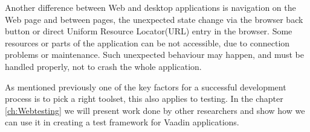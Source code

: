 		Another difference between Web and desktop applications is
		navigation on the Web page and between pages, the unexpected state change via
		the browser back button or direct Uniform Resource Locator(URL) entry in the
		browser. Some resources or parts of the application can be not
		accessible, due to connection problems or maintenance. Such unexpected
		behaviour may happen, and must be handled properly, not to crash the whole application.

    As mentioned previously one of the key factors for a successful
    development process is to pick a right toolset, this also applies to
    testing. In the chapter \ref{ch:Webtesting} we will present work done by
    other researchers and show how we can use it in creating a test framework
    for Vaadin applications.
      
\iffalse
		Web testing includes the different type of testing like:
		\begin{itemize}
		  \item functionality tests
		  \item compatibility tests
		  \item load tests
		  \item performance tests
		  \item integration tests
		\end{itemize}

		All these types of tests are equivalent important and picking a tool which
		will help to write these tests is not an easy task. 
		
		It is an advantage when	the testing tool is using same principles and similar programming language
		with other tools in the project. We think that using same programming language
		to write both tests and code is much easier for the developer. This idea is
		related to Test Driven Development(TDD), when tests are written
		before production code.
		
\fi				